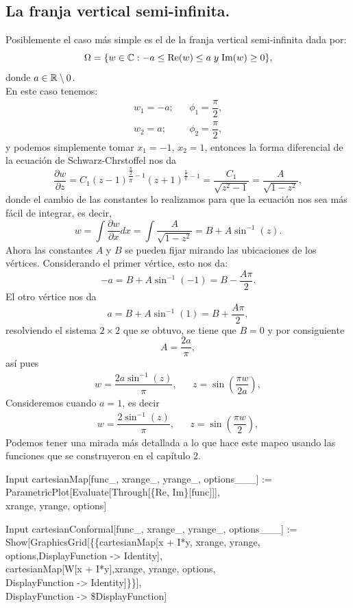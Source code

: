 \subsection{La franja vertical semi-infinita.}
Posiblemente el caso más simple es el de la franja vertical semi-infinita dada por:
$$\Omega=\{ w\in \mathbb{C} : -a\leq \mbox{Re}(w)\leq a\; y \; \mbox{Im}(w)\geq 0  \},$$
donde $a\in\mathbb{R}\setminus{0}$.\\
En este caso tenemos:
\[
\begin{array}{lcr}
	w_1=-a;&&\phi_1=\dfrac{\pi}{2},\\
	w_2=a;&&\phi_2=\dfrac{\pi}{2},
\end{array}
\]
y podemos simplemente tomar $x_1=-1$, $x_2=1$, entonces la forma diferencial de la ecuación de Schwarz-Chrstoffel nos da
$$\dfrac{\partial w}{\partial z}=C_1(z-1)^{\dfrac{\frac{\pi}{2}}{\pi}-1}(z+1)^{\frac{\frac{\pi}{2}}{\pi}-1}=\dfrac{C_1}{\sqrt{z^2-1}}=\dfrac{A}{\sqrt{1-z^2}},$$
donde el cambio de las constantes lo realizamos para que la ecuación nos sea más fácil de integrar, es decir,
\[
w=\int \dfrac{\partial w}{\partial x}dx=\int \dfrac{A}{\sqrt{1-z^2}}=B+A\sin^{-1}(z).
\]
Ahora las constantes $A$ y $B$ se pueden fijar mirando las ubicaciones de los vértices. Considerando el primer vértice, esto nos da:
$$-a=B+A\sin^{-1}(-1)=B-\dfrac{A\pi}{2}.$$
El otro vértice nos da
$$a=B+A\sin^{-1}(1)=B+\dfrac{A\pi}{2},$$
resolviendo el sistema $2\times2$ que se obtuvo, se tiene que $B=0$ y por consiguiente $$A=\dfrac{2a}{\pi},$$
así pues 
\[
\begin{array}{lcr}
	w=\dfrac{2a\sin^{-1}(z)}{\pi},&&z=\sin\left(\dfrac{\pi w}{2a}\right),
\end{array}
\]
Consideremos cuando $a=1$, es decir
\[
\begin{array}{lcr}
	w=\dfrac{2\sin^{-1}(z)}{\pi},&&z=\sin\left(\dfrac{\pi w}{2}\right),
\end{array}
\]
Podemos tener una mirada más detallada a lo que hace este mapeo usando las funciones que se construyeron en el capítulo 2.

\begin{mmaCell}{Input}
	 cartesianMap[func_, xrange_, yrange_, options___] := \\ParametricPlot[Evaluate[Through[\{Re, Im\}[func]]],\\xrange, yrange, options]
\end{mmaCell}

\begin{mmaCell}{Input}
	 cartesianConformal[func_, xrange_, yrange_, options___] :=\\Show[GraphicsGrid[\{\{cartesianMap[x + I*y, xrange, yrange,\\options,DisplayFunction -> Identity],\\cartesianMap[W[x + I*y],xrange, yrange, options,\\DisplayFunction -> Identity]\}\}],\\DisplayFunction -> \$DisplayFunction]
\end{mmaCell}


